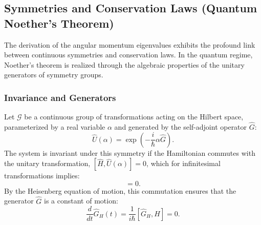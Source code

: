 \subsection{Symmetries and Conservation Laws (Quantum Noether's Theorem)}

The derivation of the angular momentum eigenvalues exhibits the profound link
between continuous symmetries and conservation laws. In the quantum regime,
Noether's theorem is realized through the algebraic properties of the unitary
generators of symmetry groups.

\subsubsection{Invariance and Generators}
Let $\mathcal{G}$ be a continuous group of transformations acting on the Hilbert
space, parameterized by a real variable $\alpha$ and generated by the
self-adjoint operator $\hat{G}$:
\begin{equation}
	\hat{U}(\alpha) = \exp\left( -\frac{i}{\hbar} \alpha \hat{G} \right).
\end{equation}
The system is invariant under this symmetry if the Hamiltonian commutes with the
unitary transformation, $[\hat{H}, \hat{U}(\alpha)] = 0$, which for
infinitesimal transformations implies:
\begin{equation}
	[\hat{H}, \hat{G}] = 0.
\end{equation}
By the Heisenberg equation of motion, this commutation ensures that the generator
$\hat{G}$ is a constant of motion:
\begin{equation}
	\frac{d}{dt} \hat{G}_H(t) = \frac{1}{i\hbar} [\hat{G}_H, \hat{H}] = 0.
\end{equation}

